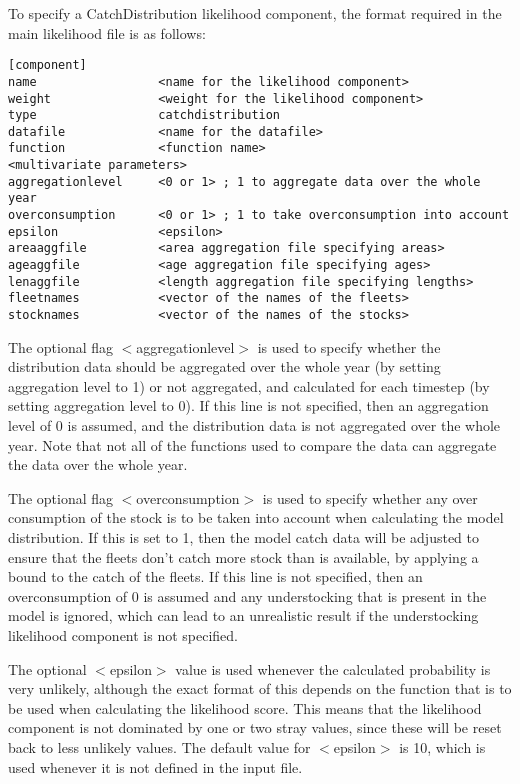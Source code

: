 \documentclass[]{book}
\begin{document}
To specify a CatchDistribution likelihood component, the format required
in the main likelihood file is as follows:

\begin{verbatim}
[component]
name                 <name for the likelihood component>
weight               <weight for the likelihood component>
type                 catchdistribution
datafile             <name for the datafile>
function             <function name>
<multivariate parameters>
aggregationlevel     <0 or 1> ; 1 to aggregate data over the whole year
overconsumption      <0 or 1> ; 1 to take overconsumption into account
epsilon              <epsilon>
areaaggfile          <area aggregation file specifying areas>
ageaggfile           <age aggregation file specifying ages>
lenaggfile           <length aggregation file specifying lengths>
fleetnames           <vector of the names of the fleets>
stocknames           <vector of the names of the stocks>
\end{verbatim}

The optional flag \(<\)aggregationlevel\(>\) is used to specify whether the
distribution data should be aggregated over the whole year (by setting
aggregation level to 1) or not aggregated, and calculated for each
timestep (by setting aggregation level to 0). If this line is not
specified, then an aggregation level of 0 is assumed, and the
distribution data is not aggregated over the whole year. Note that not
all of the functions used to compare the data can aggregate the data
over the whole year.

The optional flag \(<\)overconsumption\(>\) is used to specify whether any
over consumption of the stock is to be taken into account when
calculating the model distribution. If this is set to 1, then the model
catch data will be adjusted to ensure that the fleets don't catch more
stock than is available, by applying a bound to the catch of the fleets.
If this line is not specified, then an overconsumption of 0 is assumed
and any understocking that is present in the model is ignored, which can
lead to an unrealistic result if the understocking likelihood component
is not specified.

The optional \(<\)epsilon\(>\) value is used whenever the calculated
probability is very unlikely, although the exact format of this depends
on the function that is to be used when calculating the likelihood
score. This means that the likelihood component is not dominated by one
or two stray values, since these will be reset back to less unlikely
values. The default value for \(<\)epsilon\(>\) is 10, which is used
whenever it is not defined in the input file.
\end{document}
